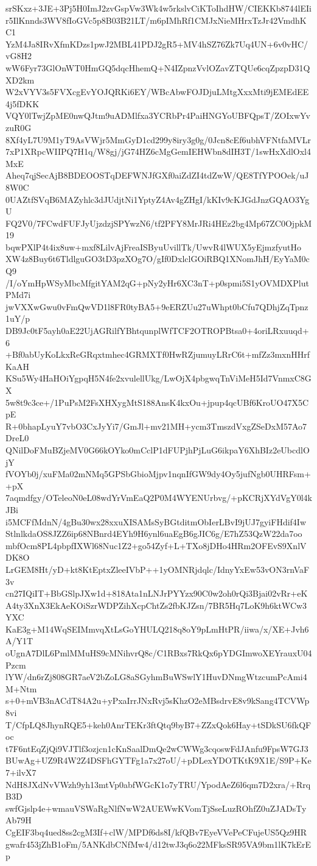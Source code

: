 srSKxz+3JE+3Pj5H0ImJ2zvGspVw3Wk4w5rkslvCiKToIhdHW/CIEKKb8744lEIi
r5IlKnnds3WV8fIoGVc5p8B03B21LT/m6pIMhRf1CMJxNieMHrxTzJr42VmdhKC1
YzM4Ja8IRvXfmKDzs1pwJ2MBL41PDJ2gR5+MV4hSZ76Zk7Uq4UN+6v0vHC/vG8H2
wW6Fyr73GlOnWT0HmGQ5dqcHhemQ+N4IZpnzVvlOZavZTQUe6cqZpzpD31QXD2km
W2xVYV3s5FVXcgEvYOJQRKi6EY/WBcAbwFOJDjuLMtgXxxMti9jEMEdEE4j5fDKK
VQY0lTwjZpME0nwQJtm9uADMlfxa3YCRbPr4PaiHNGYoUBFQpsT/ZOIxwYvzuR0G
8Xf4yL7U9M1yT9AsVWjr5MmGyD1cd299y8iry3g0g/0Jcn8cEf6ubhVFNtfaMVLr
7xP1XRpcWIIPQ7H1q/W8gj/jG74HZ6cMgGemIEHWbn8dIH3T/1swHxXdlOxl4MxE
Aheq7qjSecAjB8BDEOOSTqDEFWNJfGXf0aiZdZI4tdZwW/QE8TfYPOOek/uJ8W0C
0UAZtfSVqB6MAZyhlc3dJUdjtNi1YptyZ4Av4gZHgI/kKIv9cKJGdJnzGQAO3YgU
FQ2V0/7FCwdFUFJyUjzdzjSPYwzN6/tf2PFY8MrJRi4HEz2bg4Mp67ZC0OjpkM19
bqwPXlP4t4ix8uw+mxf8LilvAjFreaISByuUvillTk/UwvR4lWUX5yEjmzfyutHo
XW4z8Buy6t6TldlguGO3tD3pzXOg7O/gIf0DxlclGOiRBQ1XNomJhH/EyYaM0cQ9
/I/oYmHpWSyMbcMfgitYAM2qG+pNy2yHr6XC3nT+p0spmi5S1yOVMDXPlutPMd7i
jwVXXwGwu0vFmQwVD1l8FR0tyBA5+9eERZUu27uWhpt0bCfu7QDhjZqTpnz1uY/p
DB9Jc0tF5ayh0aE22UjAGRilfYBhtqunplWfTCF2OTROPBtsa0+4oriLRxuuqd+6
+Bf0abUyKoLkxReGRqxtmhec4GRMXTf0HwRZjumuyLRrC6t+mfZz3mxnHHrfKaAH
KSu5Wy4HaHOiYgpqH5N4fe2xvulellUkg/LwOjX4pbgwqTnViMeH5Id7VnmxC8GX
5w8t9c3ce+/1PuPsM2FsXHXygMtS188AnsK4kxOu+jpup4qcUBf6KroUO47X5CpE
R+0bhapLyuY7vbO3CxJyYi7/GmJl+mv21MH+ycm3TmszdVxgZSeDxM57Ao7DreL0
QNilDoFMuBZjeMV0G66kOYko0mCclP1dFUPjhPjLuG6ikpaY6XhBIz2eUbcdlOjY
fVOYb0j/xuFMa02mNMq5GPSbGbioMjpv1nqnIfGW9dy4Oy5jufNgb0UHRFsm++pX
7aqmdfgy/OTeleoN0eL08wdYrVmEaQ2P0M4WYENUrbvg/+pKCRjXYdVgY0l4kJBi
i5MCFfMdnN/4gBu30wx28xxuXISAMsSyBGtditmObIerLBvI9jUJ7gyiFHdif4Iw
StlnlkdaOS8JZZ6ip68NBnrd4EYh9H6ynl6uaEgB6gJIC6g/E7hZ53QzW22da7oo
mbfOcm8PL4pbpfIXWl68Nuc1Z2+go54Zyf+L+TXo8jDHo4HRm2OFEvS9XnlVDK8O
LrGEM8Ht/yD+kt8KtEptxZleeIVbP++1yOMNRjdqlc/IdnyYxEw53vON3rnVaF3v
cn27IQiIT+BbGSlpJXw1d+818Ata1nLNJrPYYzx90C0w2oh0rQi3Bjai02vRr+eK
A4ty3XnX3EkAeKOiSzrWDPZihXcpChtZs2fbKJZsn/7BR5Hq7LoK9h6ktWCw3YXC
KaE3g+M14WqSEIMmvqXtLsGoYHULQ218q8oY9pLmHtPR/iiwa/x/XE+Jvh6A/Y1T
oUgnA7DlL6PmlMMuHS9cMNihvrQ8c/C1RBxs7RkQx6pYDGImwoXEYrauxU04Pzcm
lYW/dn6rZj808GR7aeV2bZoLG8aSGyhmBuWSwlY1HuvDNmgWtzcumPcAmi4M+Ntm
s+0+mVB3nACdT84A2u+yPxaIrrJNxRvj5sKhzO2eMBsdrvE8v9kSang4TCVWp8vi
T/CfpLQ8JhynRQE5+keh0AnrTEKr3ftQtq9byB7+ZZxQok6Hay+tSDkSU6fkQFoc
t7F6ntEqZjQi9VJTlf3ozjcn1cKnSaalDmQe2wCWWg3cqoswFdJAnfu9FpsW7GJ3
BUwAg+UZ9R4W2Z4DSFhGYTFg1a7x27oU/+pDLexYDOTKtK9X1E/S9P+Ke7+ilvX7
NdH8JXdNvVWzh9yh13mtVp0abfWGcK1o7yTRU/YpodAeZ6l6qm7D2xra/+RrqB3D
swfGjslp4e+wmauVSWaRgNlfNwW2AUEWwKVomTjSseLuzROhfZ0uZJADsTyAb79H
CgEIF3bq4ued8ss2cgM3If+clW/MPDf6ds8I/kfQBv7EyeVVePeCFujeUS5Qz9HR
gwafr453jZhB1oFm/5ANKdbCNfMw4/d12twJ3q6o22MFksSR95VA9bm1lK7kErEp
